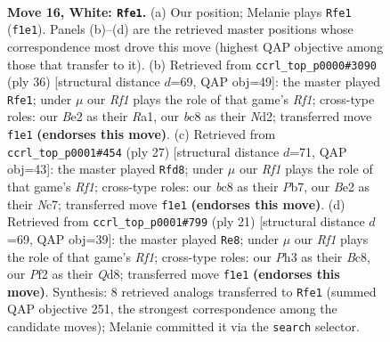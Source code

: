 \documentclass[11pt]{article}
\begin{document}
\clearpage

\begin{figure}[p]\centering
\begin{subfigure}{0.46\textwidth}\centering
\resizebox{\linewidth}{!}{%
\newchessgame
\chessboard[
  setfen={rnbqr1k1/5p2/1p2pnp1/7p/p2P4/B1P2N1P/PQ2BPP1/R4RK1 w - - 0 16},
  showmover=false,
  pgfstyle=straightmove, color=movearrow, markmove={f1-e1}
]}
\caption{}
\end{subfigure}\hfill
\begin{subfigure}{0.46\textwidth}\centering
\resizebox{\linewidth}{!}{%
\newchessgame
\chessboard[
  setfen={r1b2rk1/1p2qppp/2p2n2/p7/P1BP4/1P6/2QN1PPP/R4RK1 w - - 1 19},
  showmover=false,
  pgfstyle=straightmove, color=movearrow, markmove={f1-e1}
]}
\caption{}
\end{subfigure}
\\[4pt]
\begin{subfigure}{0.46\textwidth}\centering
\resizebox{\linewidth}{!}{%
\newchessgame
\chessboard[
  setfen={r4rk1/ppnqppb1/2p1b1pp/P3P3/3P4/2N2N1P/1P3PP1/R1BQR1K1 b - - 0 14},
  showmover=false,
  pgfstyle=straightmove, color=movearrow, markmove={f8-d8}
]}
\caption{}
\end{subfigure}\hfill
\begin{subfigure}{0.46\textwidth}\centering
\resizebox{\linewidth}{!}{%
\newchessgame
\chessboard[
  setfen={r1bq1rk1/ppp2pp1/3b1n1p/5p1P/2BP4/2N1PN2/PPQ2PP1/R3K2R b KQ - 1 11},
  showmover=false,
  pgfstyle=straightmove, color=movearrow, markmove={f8-e8}
]}
\caption{}
\end{subfigure}
\caption{\textbf{Move 16, White: \texttt{Rfe1}.} (a) Our position; Melanie plays \texttt{Rfe1} (\texttt{f1e1}). Panels (b)--(d) are the retrieved master positions whose correspondence most drove this move (highest QAP objective among those that transfer to it). (b) Retrieved from \texttt{ccrl\_top\_p0000\#3090} (ply 36) [structural distance $d$=69, QAP obj=49]: the master played \texttt{Rfe1}; under $\mu$ our \emph{Rf1} plays the role of that game's \emph{Rf1}; cross-type roles: our \emph{B}e2 as their \emph{R}a1, our \emph{b}c8 as their \emph{N}d2; transferred move \texttt{f1e1} \textbf{(endorses this move)}. (c) Retrieved from \texttt{ccrl\_top\_p0001\#454} (ply 27) [structural distance $d$=71, QAP obj=43]: the master played \texttt{Rfd8}; under $\mu$ our \emph{Rf1} plays the role of that game's \emph{Rf1}; cross-type roles: our \emph{b}c8 as their \emph{P}b7, our \emph{B}e2 as their \emph{N}c7; transferred move \texttt{f1e1} \textbf{(endorses this move)}. (d) Retrieved from \texttt{ccrl\_top\_p0001\#799} (ply 21) [structural distance $d$=69, QAP obj=39]: the master played \texttt{Re8}; under $\mu$ our \emph{Rf1} plays the role of that game's \emph{Rf1}; cross-type roles: our \emph{P}h3 as their \emph{B}c8, our \emph{P}f2 as their \emph{Q}d8; transferred move \texttt{f1e1} \textbf{(endorses this move)}. Synthesis: 8 retrieved analogs transferred to \texttt{Rfe1} (summed QAP objective 251, the strongest correspondence among the candidate moves); Melanie committed it via the \texttt{search} selector.}
\label{fig:thought-m30}
\end{figure}
\end{document}
